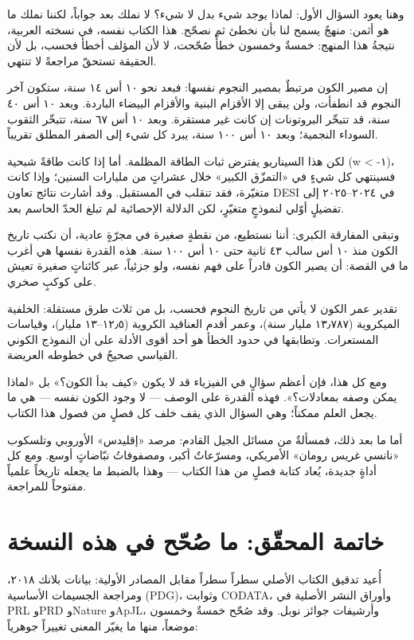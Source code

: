 \documentclass[12pt,a4paper,openany]{book}
\begin{document}
وهنا يعود السؤال الأول: لماذا يوجد شيء بدل لا شيء؟ لا نملك بعد جواباً، لكننا نملك ما هو أثمن: منهجٌ يسمح لنا بأن نخطئ ثم نصحّح. هذا الكتاب نفسه، في نسخته العربية، نتيجةُ هذا المنهج: خمسةٌ وخمسون خطأً صُحّحت، لا لأن المؤلف أخطأ فحسب، بل لأن الحقيقة تستحقّ مراجعةً لا تنتهي.


إن مصير الكون مرتبطٌ بمصير النجوم نفسها: فبعد نحو ١٠ أس ١٤ سنة، ستكون آخر النجوم قد انطفأت، ولن يبقى إلا الأقزام البنية والأقزام البيضاء الباردة. وبعد ١٠ أس ٤٠ سنة، قد تتبخّر البروتونات إن كانت غير مستقرة. وبعد ١٠ أس ٦٧ سنة، تتبخّر الثقوب السوداء النجمية؛ وبعد ١٠ أس ١٠٠ سنة، يبرد كل شيء إلى الصفر المطلق تقريباً.


لكن هذا السيناريو يفترض ثبات الطاقة المظلمة. أما إذا كانت طاقةً شبحية (w < -١)، فسينتهي كل شيءٍ في «التمزّق الكبير» خلال عشراتٍ من مليارات السنين؛ وإذا كانت متغيّرة، فقد تنقلب في المستقبل. وقد أشارت نتائج تعاون DESI في ٢٠٢٤–٢٠٢٥ إلى تفضيلٍ أوّلي لنموذجٍ متغيّرٍ، لكن الدلالة الإحصائية لم تبلغ الحدّ الحاسم بعد.


وتبقى المفارقة الكبرى: أننا نستطيع، من نقطةٍ صغيرة في مجرّةٍ عادية، أن نكتب تاريخ الكون منذ ١٠ أس سالب ٤٣ ثانية حتى ١٠ أس ١٠٠ سنة. هذه القدرة نفسها هي أغرب ما في القصة: أن يصير الكون قادراً على فهم نفسه، ولو جزئياً، عبر كائناتٍ صغيرة تعيش على كوكبٍ صخري.


تقدير عمر الكون لا يأتي من تاريخ النجوم فحسب، بل من ثلاث طرق مستقلة: الخلفية الميكروية (١٣٫٧٨٧ مليار سنة)، وعمر أقدم العناقيد الكروية (١٢٫٥–١٣ مليار)، وقياسات المستعرات. وتطابقها في حدود الخطأ هو أحد أقوى الأدلة على أن النموذج الكوني القياسي صحيحٌ في خطوطه العريضة.


ومع كل هذا، فإن أعظم سؤالٍ في الفيزياء قد لا يكون «كيف بدأ الكون؟» بل «لماذا يمكن وصفه بمعادلات؟». فهذه القدرة على الوصف — لا وجود الكون نفسه — هي ما يجعل العلم ممكناً؛ وهي السؤال الذي يقف خلف كل فصلٍ من فصول هذا الكتاب.


أما ما بعد ذلك، فمسألةٌ من مسائل الجيل القادم: مرصد «إقليدس» الأوروبي وتلسكوب «نانسي غريس رومان» الأمريكي، ومسرّعاتٌ أكبر، ومصفوفاتُ نبّاضاتٍ أوسع. ومع كل أداةٍ جديدة، يُعاد كتابة فصلٍ من هذا الكتاب — وهذا بالضبط ما يجعله تاريخاً علمياً مفتوحاً للمراجعة.


\chapter*{خاتمة المحقّق: ما صُحّح في هذه النسخة}



أُعيد تدقيق الكتاب الأصلي سطراً سطراً مقابل المصادر الأولية: بيانات بلانك ٢٠١٨، ومراجعة الجسيمات الأساسية (PDG)، وثوابت CODATA، وأوراق النشر الأصلية في PRL وPRD وNature وApJL، وأرشيفات جوائز نوبل. وقد صُحّح خمسةٌ وخمسون موضعاً، منها ما يغيّر المعنى تغييراً جوهرياً:
\end{document}
